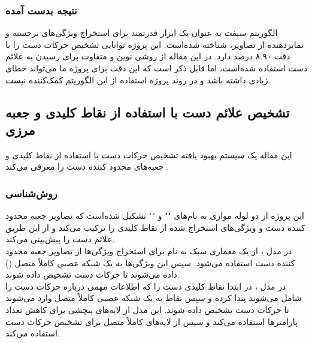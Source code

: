 \subsubsection{نتیجه بدست آمده}
الگوریتم سیفت  به عنوان یک ابزار قدرتمند برای استخراج ویژگی‌های برجسته و تمایزدهنده از تصاویر، شناخته شده‌است. این پروژه توانایی تشخیص حرکات دست را با دقت ۸.۹۰ درصد دارد. در این مقاله از روشی نوین و متفاوت برای رسیدن به علائم دست استفاده شده‌است، اما قابل ذکر است که این دقت برای پروژه ما می‌تواند خطای زیادی داشته باشد و در روند پروژه استفاده از این الگوریتم کمک‌کننده نیست.




\subsection {تشخيص علائم دست با استفاده از نقاط کلیدی و جعبه مرزی}
این مقاله یک سیستم بهبود یافته تشخیص حرکات دست با استفاده از نقاط کلیدی و جعبه‌های محدود کننده دست را معرفی می‌کند \cite{dang2022improved}.


\subsubsection{روش‌شناسی}
این پروژه از دو لوله موازی به نام‌های "" و "" تشکیل شده‌است که تصاویر جعبه 
محدود کننده دست و ویژگی‌های استخراج شده از نقاط کلیدی را ترکیب می‌کند و از این طریق علائم دست را پیش‌بینی می‌کند. 
\\
در مدل ، از یک معماری سبک به نام  برای استخراج ویژگی‌ها از تصاویر جعبه 
محدود کننده دست استفاده می‌شود. سپس این ویژگی‌ها به یک شبکه عصبی کاملاً متصل
() داده می‌شوند تا حرکات دست تشخیص داده شوند.
\\
در مدل  ، در ابتدا نقاط کلیدی دست را که اطلاعات مهمی درباره حرکات دست را شامل می‌شوند پیدا کرده و سپس نقاط به یک شبکه عصبی کاملاً متصل وارد می‌شوند تا حرکات دست
تشخیص داده شوند. این مدل از لایه‌های پیچشی برای کاهش تعداد پارامترها استفاده می‌کند و سپس از لایه‌های کاملاً متصل برای تشخیص حرکات دست استفاده می‌کند.


